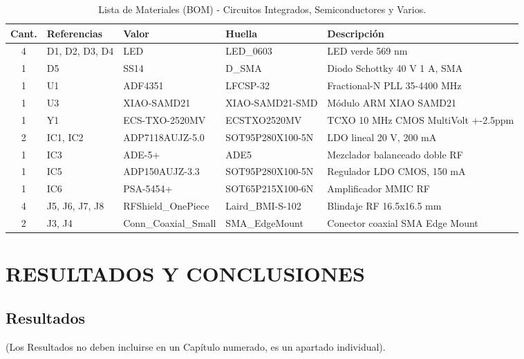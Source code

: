 \documentclass[11pt,a4paper,twoside]{report}
\begin{document}
	\begin{table}
		\centering
		\small
		\begin{tabularx}{\textwidth}{c p{4.2cm} l p{2.5cm} X}
			\toprule
			\textbf{Cant.} & \textbf{Referencias} & \textbf{Valor} & \textbf{Huella} & \textbf{Descripción} \\
			\midrule
			4 & D1, D2, D3, D4 & LED & LED\_0603 & LED verde 569 nm \\
			1 & D5 & SS14 & D\_SMA & Diodo Schottky 40 V 1 A, SMA \\
			1 & U1 & ADF4351 & LFCSP-32 & Fractional-N PLL 35-4400 MHz \\
			1 & U3 & XIAO-SAMD21 & XIAO-SAMD21-SMD & Módulo ARM XIAO SAMD21 \\
			1 & Y1 & ECS-TXO-2520MV & ECSTXO2520MV & TCXO 10 MHz CMOS MultiVolt +-2.5ppm \\
			2 & IC1, IC2 & ADP7118AUJZ-5.0 & SOT95P280X100-5N & LDO lineal 20 V, 200 mA \\
			1 & IC3 & ADE-5+ & ADE5 & Mezclador balanceado doble RF \\
			1 & IC5 & ADP150AUJZ-3.3 & SOT95P280X100-5N & Regulador LDO CMOS, 150 mA \\
			1 & IC6 & PSA-5454+ & SOT65P215X100-6N & Amplificador MMIC RF \\
			4 & J5, J6, J7, J8 & RFShield\_OnePiece & Laird\_BMI-S-102 & Blindaje RF 16.5x16.5 mm \\
			2 & J3, J4 & Conn\_Coaxial\_Small & SMA\_EdgeMount & Conector coaxial SMA Edge Mount \\
			\bottomrule
		\end{tabularx}
		\caption{Lista de Materiales (BOM) - Circuitos Integrados, Semiconductores y Varios.}
		\label{tab:bom_semiconductores_varios}
	\end{table}
		
	\part{RESULTADOS Y CONCLUSIONES}
	\chapter*{Resultados}
	(Los Resultados no deben incluirse en un Capítulo numerado, es un apartado individual).
	
\end{document}
